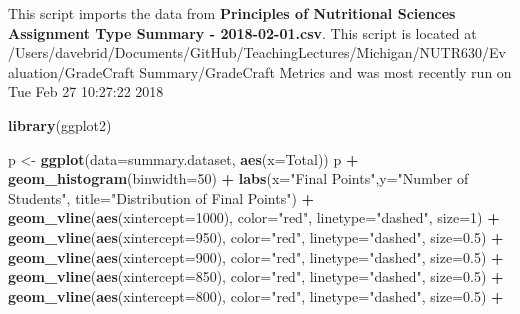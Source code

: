 \documentclass[]{article}
\newenvironment{Shaded}{\begin{snugshade}}{\end{snugshade}}
\newcommand{\KeywordTok}[1]{\textcolor[rgb]{0.13,0.29,0.53}{\textbf{#1}}}
\newcommand{\DataTypeTok}[1]{\textcolor[rgb]{0.13,0.29,0.53}{#1}}
\newcommand{\DecValTok}[1]{\textcolor[rgb]{0.00,0.00,0.81}{#1}}
\newcommand{\FloatTok}[1]{\textcolor[rgb]{0.00,0.00,0.81}{#1}}
\newcommand{\StringTok}[1]{\textcolor[rgb]{0.31,0.60,0.02}{#1}}
\newcommand{\OperatorTok}[1]{\textcolor[rgb]{0.81,0.36,0.00}{\textbf{#1}}}
\newcommand{\NormalTok}[1]{#1}
\begin{document}
This script imports the data from \textbf{Principles of Nutritional
Sciences Assignment Type Summary - 2018-02-01.csv}. This script is
located at
/Users/davebrid/Documents/GitHub/TeachingLectures/Michigan/NUTR630/Evaluation/GradeCraft
Summary/GradeCraft Metrics and was most recently run on Tue Feb 27
10:27:22 2018

\begin{Shaded}
\begin{Highlighting}[]
\KeywordTok{library}\NormalTok{(ggplot2)}

\NormalTok{p <-}\StringTok{ }\KeywordTok{ggplot}\NormalTok{(}\DataTypeTok{data=}\NormalTok{summary.dataset, }\KeywordTok{aes}\NormalTok{(}\DataTypeTok{x=}\NormalTok{Total)) }
\NormalTok{p }\OperatorTok{+}\StringTok{ }\KeywordTok{geom_histogram}\NormalTok{(}\DataTypeTok{binwidth=}\DecValTok{50}\NormalTok{) }\OperatorTok{+}
\StringTok{  }\KeywordTok{labs}\NormalTok{(}\DataTypeTok{x=}\StringTok{"Final Points"}\NormalTok{,}\DataTypeTok{y=}\StringTok{"Number of Students"}\NormalTok{, }\DataTypeTok{title=}\StringTok{"Distribution of Final Points"}\NormalTok{) }\OperatorTok{+}
\StringTok{  }\KeywordTok{geom_vline}\NormalTok{(}\KeywordTok{aes}\NormalTok{(}\DataTypeTok{xintercept=}\DecValTok{1000}\NormalTok{), }\DataTypeTok{color=}\StringTok{"red"}\NormalTok{, }\DataTypeTok{linetype=}\StringTok{"dashed"}\NormalTok{, }\DataTypeTok{size=}\DecValTok{1}\NormalTok{) }\OperatorTok{+}
\StringTok{  }\KeywordTok{geom_vline}\NormalTok{(}\KeywordTok{aes}\NormalTok{(}\DataTypeTok{xintercept=}\DecValTok{950}\NormalTok{), }\DataTypeTok{color=}\StringTok{"red"}\NormalTok{, }\DataTypeTok{linetype=}\StringTok{"dashed"}\NormalTok{, }\DataTypeTok{size=}\FloatTok{0.5}\NormalTok{) }\OperatorTok{+}
\StringTok{  }\KeywordTok{geom_vline}\NormalTok{(}\KeywordTok{aes}\NormalTok{(}\DataTypeTok{xintercept=}\DecValTok{900}\NormalTok{), }\DataTypeTok{color=}\StringTok{"red"}\NormalTok{, }\DataTypeTok{linetype=}\StringTok{"dashed"}\NormalTok{, }\DataTypeTok{size=}\FloatTok{0.5}\NormalTok{) }\OperatorTok{+}
\StringTok{  }\KeywordTok{geom_vline}\NormalTok{(}\KeywordTok{aes}\NormalTok{(}\DataTypeTok{xintercept=}\DecValTok{850}\NormalTok{), }\DataTypeTok{color=}\StringTok{"red"}\NormalTok{, }\DataTypeTok{linetype=}\StringTok{"dashed"}\NormalTok{, }\DataTypeTok{size=}\FloatTok{0.5}\NormalTok{) }\OperatorTok{+}
\StringTok{  }\KeywordTok{geom_vline}\NormalTok{(}\KeywordTok{aes}\NormalTok{(}\DataTypeTok{xintercept=}\DecValTok{800}\NormalTok{), }\DataTypeTok{color=}\StringTok{"red"}\NormalTok{, }\DataTypeTok{linetype=}\StringTok{"dashed"}\NormalTok{, }\DataTypeTok{size=}\FloatTok{0.5}\NormalTok{) }\OperatorTok{+}

\end{Highlighting}
\end{Shaded}
\end{document}
